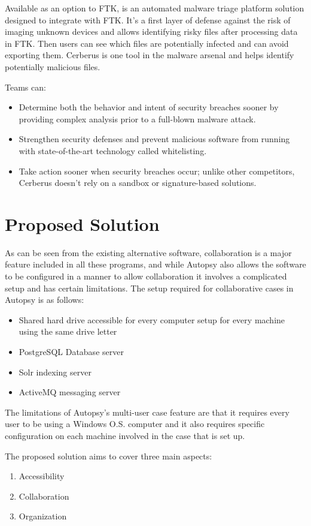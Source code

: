 Available as an option to FTK,  \cite{cerberus} is an automated malware triage platform solution designed to integrate 
with FTK. It's a first layer of defense against the risk of imaging unknown devices and allows identifying 
risky files after processing data in FTK. Then users can see which files are potentially infected and can avoid 
exporting them. Cerberus is one tool in the malware arsenal and helps identify potentially malicious files.

Teams can:
\begin{itemize}
\item Determine both the behavior and intent of security breaches sooner by providing complex analysis prior 
to a full-blown malware attack. 
\item Strengthen security defenses and prevent malicious software from running with state-of-the-art technology 
called whitelisting. 
\item Take action sooner when security breaches occur; unlike other competitors, Cerberus doesn't rely on a sandbox 
or signature-based solutions. 
\end{itemize}

\section{Proposed Solution}

As can be seen from the existing alternative software, collaboration is a major feature included in all these programs, and while Autopsy also allows the software to be
configured in a manner to allow collaboration it involves a complicated setup and has certain limitations.
The setup required for collaborative cases in Autopsy is as follows:
\begin{itemize}
 \item Shared hard drive accessible for every computer setup for every machine using the same drive letter
 \item PostgreSQL Database server 
 \item Solr indexing server
 \item ActiveMQ messaging server
\end{itemize}
The limitations of Autopsy's multi-user case feature are that it requires every user to be using a Windows O.S. computer and it also requires specific configuration on each
machine involved in the case that is set up.

The proposed solution aims to cover three main aspects:
\begin{enumerate}
 \item Accessibility
 \item Collaboration
 \item Organization 
\end{enumerate}

